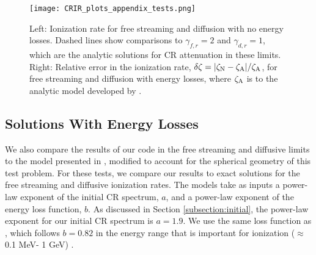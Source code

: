 \documentclass[twocolumn]{aastex63}
\begin{document}
\begin{figure*}
\centering
\texttt{[image: CRIR\_plots\_appendix\_tests.png]}
\caption{Left: Ionization rate for free streaming and diffusion with no energy losses. Dashed lines show comparisons to $\gamma_{f,r}=2$ and $\gamma_{d,r}=1$, which are the analytic solutions for CR attenuation in these limits. Right: Relative error in the ionization rate, $\delta \zeta = |\zeta_{\rm N} -\zeta_{\rm A}|/\zeta_{\rm A}$, for free streaming and diffusion with energy losses, where $\zeta_{\rm A}$ is to the analytic model developed by \cite{silsbee_2019_model}. }
\label{fig:crir_plots_appendix}
\end{figure*}

\subsection{Solutions With Energy Losses}
\label{appendix_subsection:tests_losses}

We also compare the results of our code in the free streaming and diffusive limits to the model presented in \cite{silsbee_2019_model}, modified to account for the spherical geometry of this test problem. For these tests, we compare our results to exact solutions for the free streaming and diffusive ionization rates. The models take as inputs a power-law exponent of the initial CR spectrum, $a$, and a power-law exponent of the energy loss function, $b$. As discussed in Section \ref{subsection:initial}, the power-law exponent for our initial CR spectrum is $a=1.9$. We use the same loss function as \cite{silsbee_2019_model}, which follows $b=0.82$ in the energy range that is important for ionization ($\approx$ 0.1 MeV- 1 GeV) \citep{padovani_2018_disks}.
\end{document}
